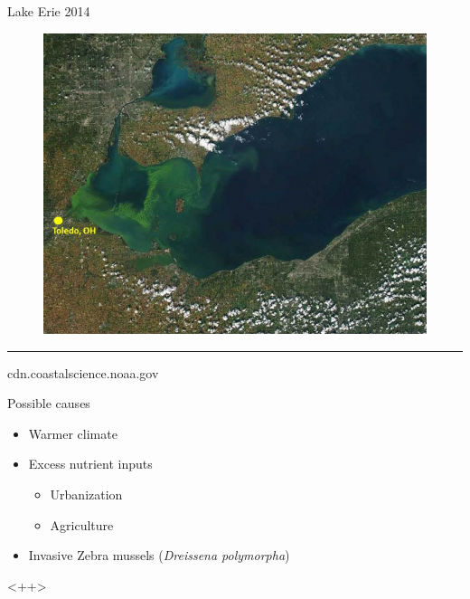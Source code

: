 \begin{frame}{Lake Erie 2014}
	\begin{figure}
		\centering
		\includegraphics[scale=0.35]{erie.jpg}
	\end{figure}
\hrule
{\tiny cdn.coastalscience.noaa.gov}
\end{frame}
\begin{frame}{Possible causes}
	\begin{itemize}
		\item Warmer climate 
		\item Excess nutrient inputs
			\begin{itemize}
				\item Urbanization 
				\item Agriculture 
			\end{itemize}
		\item Invasive Zebra mussels (\emph{Dreissena polymorpha})
	\end{itemize}

	<++>
\end{frame}
